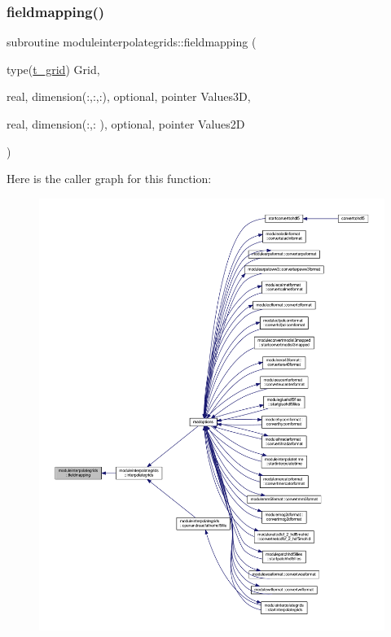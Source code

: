 \subsubsection{\texorpdfstring{fieldmapping()}{fieldmapping()}}
{\footnotesize\ttfamily subroutine moduleinterpolategrids\+::fieldmapping (\begin{DoxyParamCaption}\item[{type(\mbox{\hyperlink{structmoduleinterpolategrids_1_1t__grid}{t\+\_\+grid}})}]{Grid,  }\item[{real, dimension(\+:,\+:,\+:), optional, pointer}]{Values3D,  }\item[{real, dimension(\+:,\+:  ), optional, pointer}]{Values2D }\end{DoxyParamCaption})\hspace{0.3cm}{\ttfamily [private]}}

Here is the caller graph for this function\+:\nopagebreak
\begin{figure}[H]
\begin{center}
\leavevmode
\includegraphics[width=350pt]{namespacemoduleinterpolategrids_aedd9412531395a797c1d8d210aeacfff_icgraph}
\end{center}
\end{figure}
\mbox{\label{namespacemoduleinterpolategrids_aa49617b962704e0850c47dd72be5a154}} 
